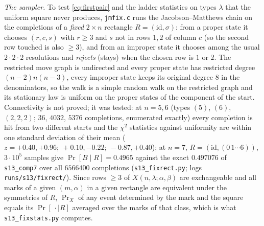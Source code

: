 \emph{The sampler.}  To test \eqref{eq:firstpair} and the ladder
statistics on types $\lambda$ that the uniform square never produces,
\texttt{jmfix.c} runs the Jacobson--Matthews chain on the completions
of a \emph{fixed} $2\times n$ rectangle $R=(\mathrm{id},\sigma)$: from a
proper state it chooses $(r,c,s)$ with $r\ge3$ and $s$ not in rows
$1,2$ of column $c$ (so the second row touched is also $\ge3$), and
from an improper state it chooses among the usual $2\cdot2\cdot2$
resolutions and \emph{rejects} (stays) when the chosen row is $1$ or
$2$.  The restricted move graph is undirected and every proper state
has restricted degree $(n-2)n(n-3)$, every improper state keeps its
original degree $8$ in the denominators, so the walk is a simple random
walk on the restricted graph and its stationary law is uniform on the
proper states of the component of the start.  Connectivity is not
proved; it was tested: at $n=5,6$ (types $(5)$, $(6)$, $(2,2,2)$;
$36$, $4032$, $5376$ completions, enumerated exactly) every completion
is hit from two different starts and the $\chi^2$ statistics against
uniformity are within one standard deviation of their mean
($z=+0.40,+0.96;\ +0.10,-0.22;\ -0.87,+0.40$); at $n=7$, $R=(\mathrm{id},(0\,1\cdots6))$,
$3\cdot10^5$ samples give $\Pr[B\mid R]=0.4965$ against the exact
$0.497076$ of \texttt{s13\_comp7} over all $6566400$ completions
(\texttt{s13\_fixrect.py}; logs \texttt{runs/s13/fixrect/}).  Since
rows $\ge3$ of $X(n,\lambda;\alpha,\beta)$ are exchangeable and all
marks of a given $(m,\alpha)$ in a given rectangle are equivalent under
the symmetries of $R$, $\Pr_X$ of any event determined by the mark and
the square equals its $\Pr[\,\cdot\mid R]$ averaged over the marks of
that class, which is what \texttt{s13\_fixstats.py} computes.

